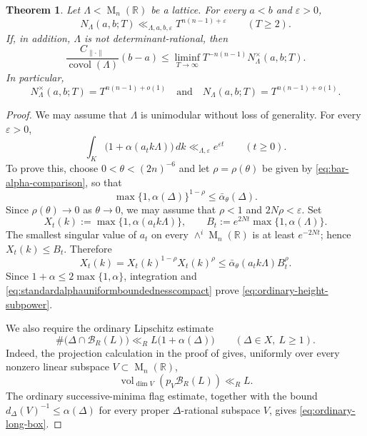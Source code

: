 \documentclass[reqno,11pt]{amsart}
\numberwithin{equation}{section}
\newtheorem{theorem}{Theorem}[section]
\theoremstyle{definition}
\theoremstyle{remark}
\newcommand{\op}{\operatorname}
\newcommand{\M}{\op{M}}
\newcommand{\covol}{\op{covol}}
\begin{document}
\begin{theorem}\label{thm:general-irrational-bounds}
Let $\Lambda<\M_n(\mathbb R)$ be a lattice. For every $a<b$ and 
$\varepsilon>0$,
$$
N_\Lambda(a,b;T)
\ll_{\Lambda,a,b,\varepsilon}
T^{n(n-1)+\varepsilon}
\qquad(T\ge2).
$$
If, in addition, $\Lambda$ is not determinant-rational, then
$$
\frac{C_{\|\cdot\|}}{\covol(\Lambda)}(b-a)
\le
\liminf_{T\to\infty}T^{-n(n-1)}
N_\Lambda^\times(a,b;T).
$$
In particular,
$$
N_\Lambda^\times(a,b;T)
=T^{n(n-1)+o(1)}
\quad\text{and}\quad
N_\Lambda(a,b;T)=T^{n(n-1)+o(1)}.
$$
\end{theorem}

\begin{proof}
We may assume that $\Lambda$ is unimodular without loss of generality. For every
$\varepsilon>0$,
\begin{equation}\label{eq:ordinary-height-subpower}
\int_K\bigl(1+\alpha(a_tk\Lambda)\bigr)\,dk
\ll_{\Lambda,\varepsilon}e^{\varepsilon t}
\qquad(t\ge0).
\end{equation}
To prove this, choose $0<\theta<(2n)^{-6}$ and let
$\rho=\rho(\theta)$ be given by
\eqref{eq:bar-alpha-comparison}, so that
$$
\max\{1,\alpha(\Delta)\}^{1-\rho}
\le\bar\alpha_\theta(\Delta).
$$
Since $\rho(\theta)\to0$ as $\theta\to0$, we may assume that
$\rho<1$ and $2N\rho<\varepsilon$. Set
$$
X_t(k):=\max\{1,\alpha(a_tk\Lambda)\},
\qquad
B_t:=e^{2Nt}\max\{1,\alpha(\Lambda)\}.
$$
The smallest singular value of $a_t$ on every
$\wedge^i\M_n(\mathbb R)$ is at least $e^{-2Nt}$; hence
$X_t(k)\le B_t$. Therefore
$$
X_t(k)
=
X_t(k)^{1-\rho}X_t(k)^\rho
\le
\bar\alpha_\theta(a_tk\Lambda)B_t^\rho.
$$
Since $1+\alpha\le2\max\{1,\alpha\}$, integration and
\eqref{eq:standardalphauniformboundednesscompact} prove
\eqref{eq:ordinary-height-subpower}.

We also require the ordinary Lipschitz estimate
\begin{equation}\label{eq:ordinary-long-box}
\#\bigl(\Delta\cap\mathscr B_R(L)\bigr)
\ll_R L\bigl(1+\alpha(\Delta)\bigr)
\qquad(\Delta\in X,\ L\ge1).
\end{equation}
Indeed, the projection calculation in the proof of
 gives, uniformly over every nonzero linear
subspace $V\subset\M_n(\mathbb R)$,
$$
\operatorname{vol}_{\dim V}(p_V\mathscr B_R(L))\ll_R L.
$$
The ordinary successive-minima flag estimate, together with the bound
$d_\Delta(V)^{-1}\le\alpha(\Delta)$ for every proper
$\Delta$-rational subspace $V$, gives
\eqref{eq:ordinary-long-box}.


\end{proof}
\end{document}
